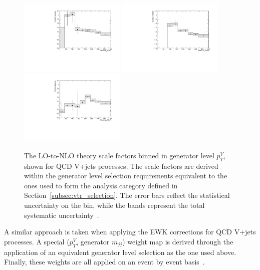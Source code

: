   \begin{figure}[htbp]
    \centering
        \includegraphics[width=0.45\textwidth]{Objects/kfactor_VTR_zjet_born_default.pdf}
        \includegraphics[width=0.45\textwidth]{Objects/kfactor_VTR_wjet_born_default.pdf}\\
        \includegraphics[width=0.45\textwidth]{Objects/kfactor_VTR_znn_born_default.pdf}
    \caption{The LO-to-NLO theory scale factors binned in generator level $p_T^V$, shown for QCD V+jets processes.
            The scale factors are derived within the generator level selection requirements equivalent to the ones used to form the analysis category defined in Section~\ref{subsec:vtr_selection}. The error bars reflect the statistical uncertainty on the bin, while the bands represent the total systematic uncertainty~\cite{note:AN_19_257}.}
    \label{fig:nlo-kfactors-w_n_z-vbf-vtr}
\end{figure}
\hspace{10pt} A similar approach is taken when applying the EWK corrections for QCD V+jets processes. A special ($p_T^{V}$, generator $m_{jj}$) weight map is derived through the application of an equivalent generator level selection as the one used above. Finally, these weights are all applied on an event by event basis~\cite{note:AN_19_257}.